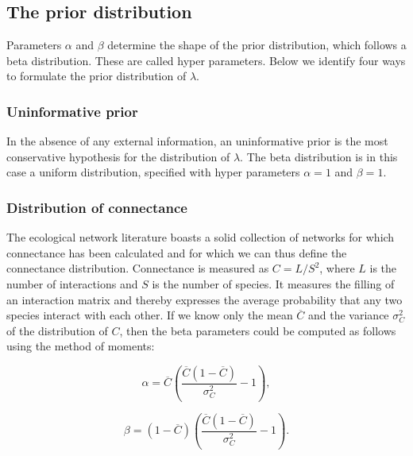 \documentclass[12pt]{article}
\begin{document}
    \subsection*{The prior distribution}    

      Parameters $\alpha$ and $\beta$ determine the shape of the prior distribution, which follows a beta distribution. These are called hyper parameters. Below we identify four ways to formulate the prior distribution of $\lambda$. 

      \subsubsection*{Uninformative prior}
        
          In the absence of any external information, an uninformative prior is the most conservative hypothesis for the distribution of $\lambda$. The beta distribution is in this case a uniform distribution, specified with hyper parameters $\alpha=1$ and $\beta=1$. 

      \subsubsection*{Distribution of connectance}
        
          The ecological network literature boasts a solid collection of networks for which connectance has been calculated and for which we can thus define the connectance distribution. Connectance is measured as $C = L/S^2$, where $L$ is the number of interactions and $S$ is the number of species. It measures the filling of an interaction matrix and thereby expresses the average probability that any two species interact with each other. If we know only the mean $\overline{C}$ and the variance $\sigma_C^2$ of the distribution of $C$,
          then the beta parameters could be computed as follows using the method of moments:

          \begin{equation}
          \alpha = \overline{C}(\frac{\overline{C}(1-\overline{C})}{\sigma_C^2}-1) ,
          \end{equation}

          \begin{equation}
          \beta = (1-\overline{C})(\frac{\overline{C}(1-\overline{C})}{\sigma_C^2}-1) .
          \end{equation}
    
\end{document}
